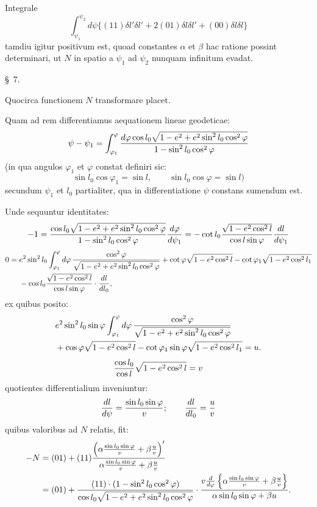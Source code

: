 Integrale
\[
 \int_{\psi_1}^{\psi_2}d\psi\{(11)\delta l'\delta l'+2(01)\delta l\delta l'+(00)\delta l\delta l\}
\]
tamdiu igitur positivum est, quoad constantes $\alpha$ et $\beta$ hac ratione possint determinari, ut $N$ in spatio a $\psi_1$ ad $\psi_2$ nunquam infinitum evadat.

\begin{center}\S\ 7.\end{center}

Quocirca functionem $N$ transformare placet.

Quam ad rem differentiamus aequationem lineae geodeticae:
\[
 \psi-\psi_1=\int_{\varphi_1}^{\varphi}{d\varphi\cos l_0\sqrt{1-e^2+e^2\sin^2l_0\cos^2\varphi}\over 1-\sin^2l_0\cos^2\varphi}
\]
(in qua angulos $\varphi_1$ et $\varphi$ constat definiri sic:
\[
 \sin l_0\cos\varphi_1=\sin l,
 \qquad \sin l_0\cos\varphi=\sin l)
\]
secundum $\psi_1$ et $l_0$ partialiter, qua in differentiatione $\psi$ constans sumendum est.

Unde sequuntur identitates:
\[
 -1={\cos l_0\sqrt{1-e^2+e^2\sin^2l_0\cos^2\varphi}\over 1-\sin^2l_0\cos^2\varphi}{d\varphi\over d\psi_1}
 =-\cot l_0{\sqrt{1-e^2\cos^2l}\over \cos l\sin\varphi}{dl\over d\psi_1}
\]
\[
\begin{aligned}
0={}&e^2\sin^2l_0\int_{\varphi_1}^{\varphi}d\varphi\,{\cos^2\varphi\over \sqrt{1-e^2+e^2\sin^2l_0\cos^2\varphi}}
       +\cot\varphi\sqrt{1-e^2\cos^2l}-\cot\varphi_1\sqrt{1-e^2\cos^2l_1} \\
&{}-\cos l_0{\sqrt{1-e^2\cos^2l}\over \cos l\sin\varphi}\cdot {dl\over dl_0},
\end{aligned}
\]
ex quibus posito:
\[
\begin{aligned}
&e^2\sin^2l_0\sin\varphi\int_{\varphi_1}^{\varphi}d\varphi\,{\cos^2\varphi\over \sqrt{1-e^2+e^2\sin^2l_0\cos^2\varphi}}\\
&{}+\cos\varphi\sqrt{1-e^2\cos^2l}-\cot\varphi_1\sin\varphi\sqrt{1-e^2\cos^2l_1}=u.
\end{aligned}
\]
\[
 {\cos l_0\over \cos l}\sqrt{1-e^2\cos^2l}=v
\]
quotientes differentialium inveniuntur:
\[
 {dl\over d\psi}={\sin l_0\sin\varphi\over v};\qquad {dl\over dl_0}={u\over v}
\]
quibus valoribus ad $N$ relatis, fit:
\[
\begin{aligned}
-N&=(01)+(11){\left({\alpha{\sin l_0\sin\varphi\over v}+\beta{u\over v}}\right)'
\over {\alpha{\sin l_0\sin\varphi\over v}+\beta{u\over v}}}\\
&=(01)+{(11)\cdot(1-\sin^2l_0\cos^2\varphi)\over \cos l_0\sqrt{1-e^2+e^2\sin^2l_0\cos^2\varphi}}
\cdot {v{d\over d\varphi}\left\{\alpha{\sin l_0\sin\varphi\over v}+\beta{u\over v}\right\}
\over \alpha\sin l_0\sin\varphi+\beta u}.
\end{aligned}
\]
